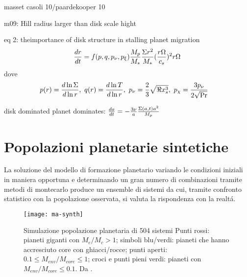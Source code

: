 \begin{workout}
masset casoli 10/paardekooper 10
\end{workout}

\begin{workout}
m09: Hill radius larger than disk scale hight
\end{workout}

\begin{workout}
eq 2: theimportance of disk structure in stalling planet migration
\begin{equation}
\TDy{t}{r}=f(p,q,p_{\nu},p_{\xi})\frac{M_p}{M_*}\frac{\Sigma r^2}{M_*}(\frac{r\Omega}{c_s})^2r\Omega
\end{equation}
dove
\begin{align}
&p(r)=\TDly{r}{\Sigma},\ q(r)=\TDly{r}{T},\ p_{\nu}=\frac{2}{3}\sqrt{\Re x_s^3},\ p_{\chi}=\frac{3p_{\nu}}{2\sqrt{\Pr}}
\end{align}
\end{workout}

\begin{workout}
disk dominated
planet dominates: $\TDy{t}{a}=-\frac{3\nu}{a}\frac{\Sigma(a,t)a^2}{M_p}$
\end{workout}

\section{Popolazioni planetarie sintetiche}
La soluzione del modello di formazione planetario variando le condizioni iniziali in maniera opportuna e determinando un gran numero di combinazioni tramite metodi di montecarlo produce un ensemble di sistemi da cui, tramite confronto statistico con la popolazione osservata,  si valuta la rispondenza con la realt\'a.

\begin{figure}[!ht]
\texttt{[image: ma-synth]}
\caption{Simulazione popolazione planetaria di 504 sistemi Punti rossi: pianeti giganti con $M_e/M_c>1$; simboli blu/verdi: pianeti che hanno accresciuto core con ghiacci/rocce; punti aperti: $0.1\leq M_{env}/M_{core}\leq1$; croci e punti pieni verdi: pianeti con $M_{env}/M_{core}\leq0.1$. Da \cite{mordasini2018planetary}.}\label{fig:ma-synth}
\end{figure}

